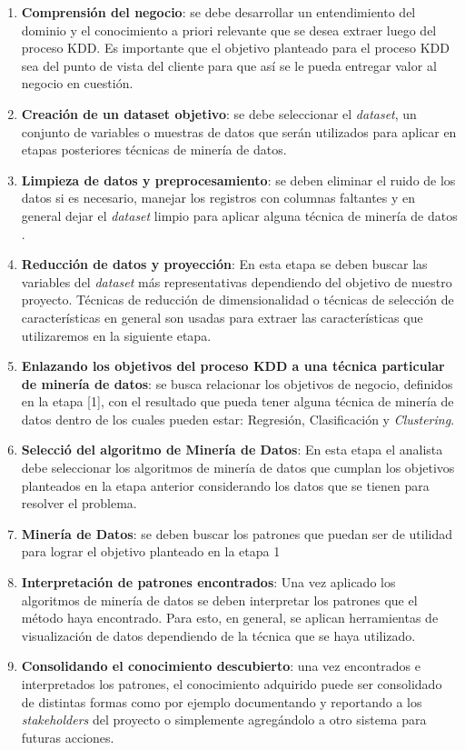 \begin{enumerate}
    \item \textbf{Comprensión del negocio}: se debe desarrollar un entendimiento del dominio y el conocimiento a priori relevante que se desea extraer luego del proceso KDD. Es importante que el objetivo planteado para el proceso KDD sea del punto de vista del cliente para que así se le pueda entregar valor al negocio en cuestión. 
    \item \textbf{Creación de un dataset objetivo}: se debe seleccionar el \textit{dataset}, un conjunto de variables o muestras de datos que serán utilizados para aplicar en etapas posteriores técnicas de minería de datos.
    \item \textbf{Limpieza de datos y preprocesamiento}: se deben eliminar el ruido de los datos si es necesario, manejar los registros con columnas faltantes y en general dejar el \textit{dataset} limpio para aplicar alguna técnica de minería de datos .
    \item \textbf{Reducción de datos y proyección}: En esta etapa se deben buscar las variables del \textit{dataset} más representativas dependiendo del objetivo de nuestro proyecto. Técnicas de reducción de dimensionalidad o técnicas de selección de características en general son usadas para extraer las características que utilizaremos en la siguiente etapa.
    \item \textbf{Enlazando los objetivos del proceso KDD a una técnica particular de minería de datos}: se busca relacionar los objetivos de negocio, definidos en la etapa [1], con el resultado que pueda tener alguna técnica de minería de datos dentro de los cuales pueden estar: Regresión, Clasificación y \textit{Clustering}.
    \item \textbf{Selecció del algoritmo de Minería de Datos}: En esta etapa el analista debe seleccionar los algoritmos de minería de datos que cumplan los objetivos planteados en la etapa anterior considerando los datos que se tienen para resolver el problema. 
    \item \textbf{Minería de Datos}: se deben buscar los patrones que puedan ser de utilidad para lograr el objetivo planteado en la etapa 1 
    \item \textbf{Interpretación de patrones encontrados}: Una vez aplicado los algoritmos de minería de datos se deben interpretar los patrones que el método haya encontrado. Para esto, en general, se aplican herramientas de visualización de datos dependiendo de la técnica que se haya utilizado.
    \item \textbf{Consolidando el conocimiento descubierto}: una vez encontrados e interpretados los patrones, el conocimiento adquirido puede ser consolidado de distintas formas como por ejemplo documentando y reportando a los \textit{stakeholders} del proyecto o simplemente agregándolo a otro sistema para futuras acciones.
\end{enumerate}

